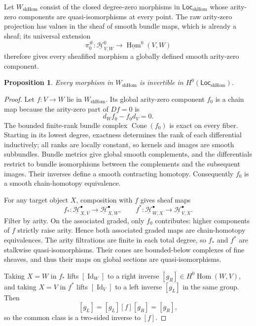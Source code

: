 \documentclass[12pt]{amsart}
\newtheorem{prop}[thm]{Proposition}
\theoremstyle{definition}
\theoremstyle{remark}
\numberwithin{equation}{section}
\newcommand{\1}{{\mathbb{1}}}
\newcommand{\Loc}{\mathsf{Loc}}
\newcommand{\id}{\operatorname{Id}}
\begin{document}
Let $W_{\mathrm{shHom}}$ consist of the closed degree-zero morphisms
in $\Loc_{\mathrm{shHom}}$ whose arity-zero components are
quasi-isomorphisms at every point.  The raw arity-zero projection has
values in the sheaf of smooth bundle maps, which is already a sheaf;
its universal extension
\[
 \pi_0^\#:
 \underline{\mathcal H}^0_{V,W}
 \longrightarrow
 \underline{\operatorname{Hom}}^0(V,W)
\]
therefore gives every sheafified morphism a globally defined smooth
arity-zero component.

\begin{prop}\label{prop:target-whitehead}
Every morphism in $W_{\mathrm{shHom}}$ is invertible in
$H^0(\Loc_{\mathrm{shHom}})$.
\end{prop}

\begin{proof}
Let $f:V\to W$ lie in $W_{\mathrm{shHom}}$.  Its global arity-zero
component $f_0$ is a chain map because the arity-zero part of
$D f=0$ is
\[
 d_Wf_0-f_0d_V=0.
\]
The bounded finite-rank bundle complex $\operatorname{Cone}(f_0)$ is
exact on every fiber.  Starting in its lowest degree, exactness
determines the rank of each differential inductively; all ranks are
locally constant, so kernels and images are smooth subbundles.  Bundle
metrics give global smooth complements, and the differentials restrict
to bundle isomorphisms between the complements and the subsequent
images.  Their inverses define a smooth contracting homotopy.
Consequently $f_0$ is a smooth chain-homotopy equivalence.

For any target object $X$, composition with $f$ gives sheaf maps
\[
 f_*:\underline{\mathcal H}^\bullet_{X,V}
 \longrightarrow\underline{\mathcal H}^\bullet_{X,W},
 \qquad
 f^*:\underline{\mathcal H}^\bullet_{W,X}
 \longrightarrow\underline{\mathcal H}^\bullet_{V,X}.
\]
Filter by arity.  On the associated graded, only $f_0$ contributes:
higher components of $f$ strictly raise arity.  Hence both associated
graded maps are chain-homotopy equivalences.  The arity filtrations are
finite in each total degree, so $f_*$ and $f^*$ are stalkwise
quasi-isomorphisms.  Their cones are bounded-below complexes of fine
sheaves, and thus their maps on global sections are quasi-isomorphisms.

Taking $X=W$ in $f_*$ lifts $[\id_W]$ to a right inverse
$[g_R]\in H^0\operatorname{Hom}(W,V)$, and taking $X=V$ in $f^*$
lifts $[\id_V]$ to a left inverse $[g_L]$ in the same group.  Then
\[
 [g_L]=[g_L][f][g_R]=[g_R],
\]
so the common class is a two-sided inverse to $[f]$.
\end{proof}
\end{document}
